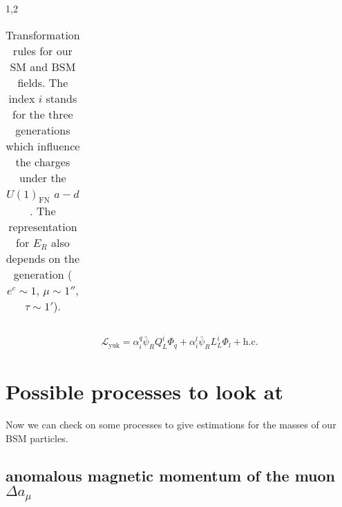 \documentclass[11pt,a4paper,twoside]{article}
\begin{document}
\begin{spacing}{1,2}
\begin{table}
\begin{tabular}{c|c|c|c}
 \end{tabular}
\caption{Transformation rules for our SM and BSM fields. The index $i$ stands for the three generations which influence the charges under the 
$U(1)_\text{FN}$ $a-d$. The representation for $E_R$ also depends on the generation ($e^c \sim 1$, $\mu \sim 1''$, $\tau \sim 1'$).}
\label{tab_model}
\end{table}
\begin{align}
 \mathcal{L}_\text{yuk} = \alpha^q_i \bar \psi_R Q^i_L \Phi_q + \alpha^l_i\bar \psi_R L^i_L \Phi_l + \text{h.c.}
\end{align}




\section{Possible processes to look at}
Now we can check on some processes to give estimations for the masses of our BSM particles.
\subsection{anomalous magnetic momentum of the muon $\Delta a_\mu$}


\end{spacing}
\end{document}
